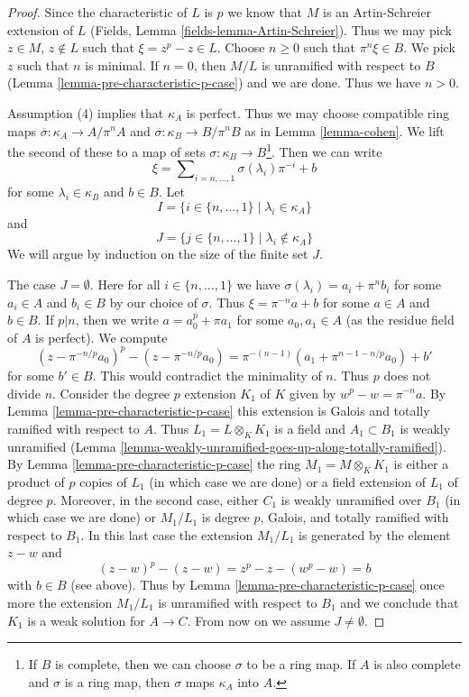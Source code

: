 \documentclass[10pt,a4paper]{amsart}
\theoremstyle{plain}
\theoremstyle{definition}
\theoremstyle{remark}
\numberwithin{equation}{subsection}
\begin{document}
\begin{proof}
Since the characteristic of $L$ is $p$ we know that $M$ is an Artin-Schreier
extension of $L$ (Fields, Lemma \ref{fields-lemma-Artin-Schreier}).
Thus we may pick $z \in M$, $z \not \in L$ such that
$\xi = z^p - z \in L$. Choose $n \geq 0$ such that $\pi^n\xi \in B$.
We pick $z$ such that $n$ is minimal. If $n = 0$, then $M/L$ is unramified
with respect to $B$ (Lemma \ref{lemma-pre-characteristic-p-case}) and
we are done. Thus we have $n > 0$.

\medskip\noindent
Assumption (4) implies that $\kappa_A$ is perfect. Thus we may
choose compatible ring maps $\overline{\sigma} : \kappa_A \to A/\pi^n A$ and
$\overline{\sigma} : \kappa_B \to B/\pi^n B$ as in
Lemma \ref{lemma-cohen}. We lift the second of these to a
map of sets $\sigma : \kappa_B \to B$\footnote{If $B$ is complete, then
we can choose $\sigma$ to be a ring map. If $A$ is also complete and
$\sigma$ is a ring map, then $\sigma$ maps $\kappa_A$ into $A$.}.
Then we can write
$$
\xi = \sum\nolimits_{i = n, \ldots, 1} \sigma(\lambda_i) \pi^{-i} + b
$$
for some $\lambda_i \in \kappa_B$ and $b \in B$. Let
$$
I = \{i \in \{n, \ldots, 1\} \mid \lambda_i \in \kappa_A\}
$$
and
$$
J = \{j \in \{n, \ldots, 1\} \mid \lambda_i \not \in \kappa_A\}
$$
We will argue by induction on the size of the finite set $J$.

\medskip\noindent
The case $J = \emptyset$. Here for all $i \in \{n, \ldots, 1\}$ we have
$\sigma(\lambda_i) = a_i + \pi^n b_i$ for some $a_i \in A$ and $b_i \in B$
by our choice of $\sigma$. Thus
$\xi = \pi^{-n} a + b$ for some $a \in A$ and $b \in B$.
If $p | n$, then we write $a = a_0^p + \pi a_1$ for some $a_0, a_1 \in A$
(as the residue field of $A$ is perfect). We compute
$$
(z - \pi^{-n/p}a_0)^p - (z - \pi^{-n/p}a_0) =
\pi^{-(n - 1)}(a_1 + \pi^{n - 1 - n/p}a_0) + b'
$$
for some $b' \in B$. This would contradict the minimality of $n$. Thus $p$
does not divide $n$. Consider the degree $p$ extension $K_1$ of $K$ given
by $w^p - w = \pi^{-n}a$. By Lemma \ref{lemma-pre-characteristic-p-case}
this extension is Galois and totally ramified with respect to $A$.
Thus $L_1 = L \otimes_K K_1$ is a field and $A_1 \subset B_1$
is weakly unramified
(Lemma \ref{lemma-weakly-unramified-goes-up-along-totally-ramified}).
By Lemma \ref{lemma-pre-characteristic-p-case}
the ring $M_1 = M \otimes_K K_1$ is either a product of $p$ copies
of $L_1$ (in which case we are done) or a field extension of $L_1$
of degree $p$. Moreover, in the second case, either $C_1$ is weakly unramified
over $B_1$ (in which case we are done) or $M_1/L_1$ is degree $p$,
Galois, and totally ramified with respect to $B_1$.
In this last case the extension $M_1/L_1$
is generated by the element $z - w$ and
$$
(z - w)^p - (z - w) = z^p - z - (w^p - w) = b
$$
with $b \in B$ (see above). Thus by Lemma \ref{lemma-pre-characteristic-p-case}
once more the extension $M_1/L_1$ is unramified with respect to $B_1$
and we conclude that $K_1$ is a weak solution for $A \to C$.
From now on we assume $J \not = \emptyset$.


\end{proof}
\end{document}
